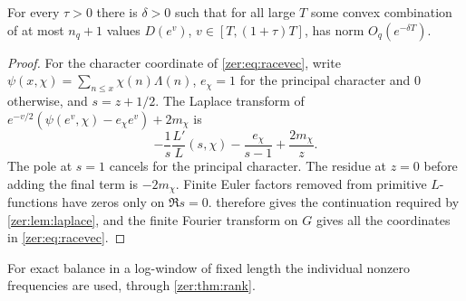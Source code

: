 \begin{corollary}\label{zer:cor:expbalance}
For every $\tau>0$ there is $\delta>0$ such that for all large $T$ some convex combination
of at most $n_q+1$ values $D(e^v)$, $v\in[T,(1+\tau)T]$, has norm $O_q(e^{-\delta T})$.
\end{corollary}
\begin{proof}
For the character coordinate of \eqref{zer:eq:racevec}, write
$\psi(x,\chi)=\sum_{n\le x}\chi(n)\Lambda(n)$, $e_\chi=1$ for the principal character and
$0$ otherwise, and $s=z+1/2$. The Laplace transform of
$e^{-v/2}(\psi(e^v,\chi)-e_\chi e^v)+2m_\chi$ is
\[
 -\frac1s\frac{L'}L(s,\chi)-\frac{e_\chi}{s-1}+\frac{2m_\chi}z .
\]
The pole at $s=1$ cancels for the principal character. The residue at $z=0$ before adding
the final term is $-2m_\chi$. Finite Euler factors removed from primitive $L$-functions
have zeros only on $\Re s=0$.  therefore gives the continuation required
by \cref{zer:lem:laplace}, and the finite Fourier transform on $G$ gives all the coordinates
in \eqref{zer:eq:racevec}.
\end{proof}

For exact balance in a log-window of fixed length the individual nonzero frequencies are
used, through \cref{zer:thm:rank}.

